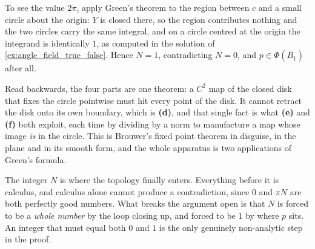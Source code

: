 \begin{exercisesolution}
\begin{enumerate}[label=\textbf{(\alph*)}]
    To see the value $2\pi$, apply Green's
    theorem to the region between $c$ and a small circle about the origin: $Y$ is closed there, so
    the region contributes nothing and the two circles carry the same integral, and on a circle
    centred at the origin the integrand is identically $1$, as computed in the solution of
    \cref{ex:angle_field_true_false}. Hence $N = 1$, contradicting $N = 0$, and
    $p \in \Phi(\overline{B_1})$ after all.
\end{enumerate}
\begin{remark}
Read backwards, the four parts are one theorem: a $C^2$ map of the closed disk that fixes the
circle pointwise must hit every point of the disk. It cannot retract the disk onto its own
boundary, which is \textbf{(d)}, and that single fact is what \textbf{(e)} and \textbf{(f)} both
exploit, each time by dividing by a norm to manufacture a map whose image \emph{is} in the circle.
This is Brouwer's fixed point theorem in disguise, in the plane and in its smooth form, and the
whole apparatus is two applications of Green's formula.

The integer $N$ is where the topology finally enters. Everything before it is calculus, and
calculus alone cannot produce a contradiction, since $0$ and $\pi N$ are both perfectly good
numbers. What breaks the argument open is that $N$ is forced to be a \emph{whole number} by the
loop closing up, and forced to be $1$ by where $p$ sits. An integer that must equal both $0$ and
$1$ is the only genuinely non-analytic step in the proof.
\end{remark}
\end{exercisesolution}

